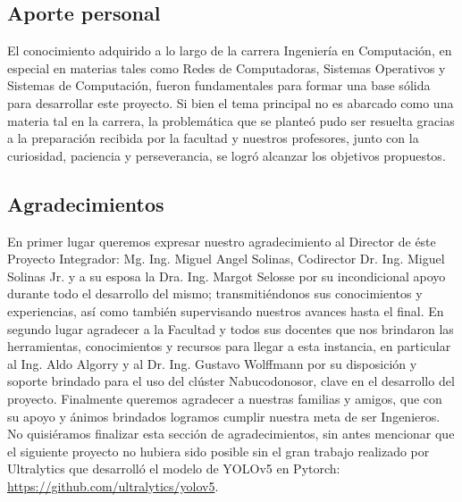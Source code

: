 \subsection{Aporte personal}

El conocimiento adquirido a lo largo de la carrera Ingeniería en Computación, en especial en materias tales como Redes de Computadoras, Sistemas Operativos y Sistemas de Computación, fueron fundamentales para formar una base sólida para desarrollar este proyecto. Si bien el tema principal no es abarcado como una materia tal en la carrera, la problemática que se planteó pudo ser resuelta gracias a la preparación recibida por la facultad y nuestros profesores, junto con la curiosidad, paciencia y perseverancia, se logró alcanzar los objetivos propuestos.

\subsection{Agradecimientos}

En primer lugar queremos expresar nuestro agradecimiento al Director de éste Proyecto Integrador: Mg. Ing. Miguel Angel Solinas, Codirector Dr. Ing. Miguel Solinas Jr. y a su esposa la Dra. Ing. Margot Selosse por su incondicional apoyo durante todo el desarrollo del mismo; transmitiéndonos sus conocimientos y experiencias, así como también supervisando nuestros avances hasta el final. En segundo lugar agradecer a la Facultad y todos sus docentes que nos brindaron las herramientas, conocimientos y recursos para llegar a esta instancia, en particular al Ing. Aldo Algorry y al Dr. Ing. Gustavo Wolffmann por su disposición y soporte brindado para el uso del clúster Nabucodonosor, clave en el desarrollo del proyecto. Finalmente queremos agradecer a nuestras familias y amigos, que con su apoyo y ánimos brindados logramos cumplir nuestra meta de ser Ingenieros.
No quisiéramos finalizar esta sección de agradecimientos, sin antes mencionar que el siguiente proyecto no hubiera sido posible sin el gran trabajo realizado por Ultralytics que desarrolló el modelo de YOLOv5 en
Pytorch: \url{https://github.com/ultralytics/yolov5}. 

\newpage
